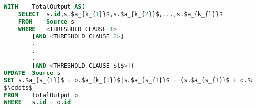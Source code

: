 \begin{lstlisting}[language=sql]
WITH	TotalOutput AS(
	SELECT	s.id,s.$a_{k_{1}}$,s.$a_{k_{2}}$,...,s.$a_{k_{l}}$
	FROM	Source s
	WHERE	<THRESHOLD CLAUSE 1>
		[AND <THRESHOLD CLAUSE 2>]
		.
		.
		.
		[AND <THRESHOLD CLAUSE $l$>])
UPDATE	Source s
SET	s.$a_{s_{1}}$ = o.$a_{k_{1}}$|s.$a_{s_{1}}$ = (s.$a_{s_{1}}$ + o.$a_{k_{1}}) * dt$; o.$a_{k_{1}}$ = o.$a_{k_{1}}$ - o.$a_{k_{1}} * dt$|s.$a_{s_{1}}$ = (s.$a_{s_{1}}$ - o.$a_{k_{1}}) * dt$; o.$a_{k_{1}}$ = o.$a_{k_{1}}$ + o.$a_{k_{1}} * dt$
$\cdots$
FROM	TotalOutput o
WHERE	s.id = o.id
\end{lstlisting}


